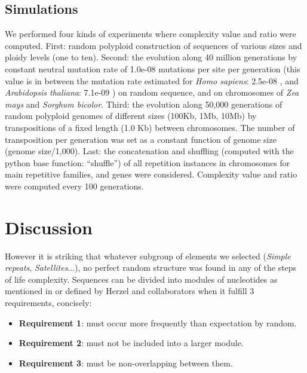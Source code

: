 \subsection{Simulations}

We performed four kinds of experiments where complexity value and ratio were computed. First: random polyploid construction of sequences of various sizes and ploidy levels (one to ten). Second: the evolution along 40 million generations by constant neutral mutation rate of 1.0e-08 mutations per site per generation (this value is in between the mutation rate estimated for {\it Homo sapiens}: 2.5e-08 \cite{Nachman2000} , and \textit{Arabidopsis thaliana}: 7.1e-09 \cite{Ossowski2010}) on random sequence, and on chromosomes of \textit{Zea mays} and \textit{Sorghum bicolor}. Third: the evolution along 50,000 generations of random polyploid genomes of different sizes (100Kb, 1Mb, 10Mb) by transpositions of a fixed length (1.0 Kb) between chromosomes. The number of transposition per generation was set as a constant function of genome size (genome size/1,000). Last: the concatenation and shuffling (computed with the python base function: ``shuffle'') of all repetition instances in chromosomes for main repetitive families, and genes were considered. Complexity value and ratio were computed every 100 generations. 

\section{Discussion}

However it is striking that whatever subgroup of elements we selected (\textit{Simple repeats}, \textit{Satellites}...), no perfect random structure was found in any of the steps of life complexity. Sequences can be divided into modules of nucleotides as mentioned in \cite{Wagner2007} or defined by Herzel and collaborators \cite{Herzel1995} when it fulfill 3 requirements, concisely:
\begin{itemize}
\item \textbf{Requirement 1}: must occur more frequently than expectation by random.
\item \textbf{Requirement 2}: must not be included into a larger module.
\item \textbf{Requirement 3}: must be non-overlapping between them.
\end{itemize}

